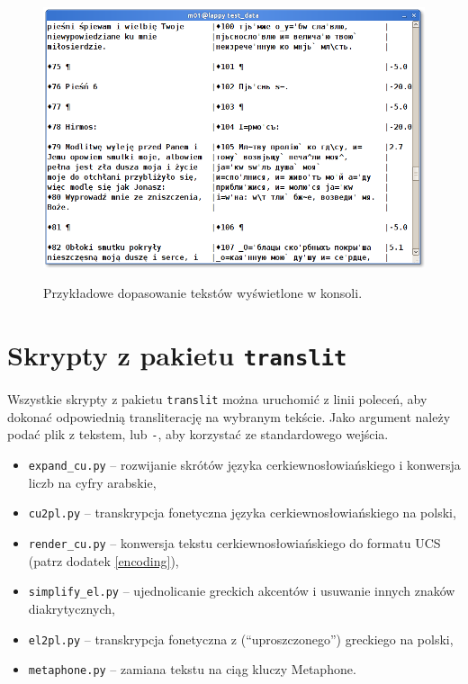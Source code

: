 \documentclass{pracamgr}
\begin{document}
\begin{figure}[h]
  \caption{Przykładowe dopasowanie tekstów wyświetlone w konsoli.}
  \centering
    \includegraphics[width=5in]{console-alignment.png}
    \label{f:alignment}
\end{figure}

\section{Skrypty z pakietu {\tt translit}}

Wszystkie skrypty z pakietu {\tt translit} można uruchomić z linii
poleceń, aby dokonać odpowiednią transliterację na wybranym
tekście. Jako argument należy podać plik z tekstem, lub {\tt -}, aby
korzystać ze standardowego wejścia.

\begin{itemize}
\item {\tt expand\_cu.py} -- rozwijanie skrótów języka
  cerkiewno\-{}słowiańskiego i konwersja liczb na cyfry arabskie,
\item {\tt cu2pl.py} -- transkrypcja fonetyczna języka
  cerkiewno\-{}słowiańskiego na polski,
\item {\tt render\_cu.py} -- konwersja tekstu
  cerkiewno\-{}słowiańskiego do formatu UCS (patrz dodatek
  \ref{encoding}),
\item {\tt simplify\_el.py} -- ujednolicanie greckich akcentów i
  usuwanie innych znaków diakrytycznych,
\item {\tt el2pl.py} -- transkrypcja fonetyczna z (``uproszczonego'')
  greckiego na polski,
\item {\tt metaphone.py} -- zamiana tekstu na ciąg kluczy Metaphone.
\end{itemize}
\end{document}
